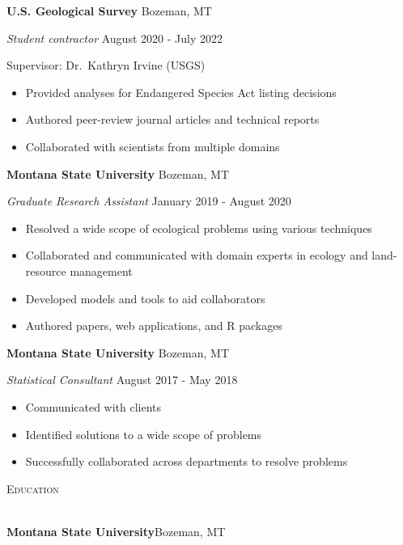 \documentclass[a4paper]{article}
\newcommand{\lineunder} {
	\vspace*{-8pt} \\
	\hspace*{-18pt} \hrulefill \\
}
\newcommand{\header} [1] {
	{\hspace*{-18pt}\vspace*{6pt} \textcolor{Cerulean}{\textsc{#1}}}
	\vspace*{-6pt} \textcolor{Cerulean}{\lineunder}
}
\begin{document}
\textbf{U.S. Geological Survey} \hfill Bozeman, MT

\textit{Student contractor} \hfill August 2020 - July 2022

Supervisor: Dr.~Kathryn Irvine (USGS)

\vspace{-1mm}
\begin{itemize} \itemsep 1pt
   \item Provided analyses for Endangered Species Act listing decisions
   \item Authored peer-review journal articles and technical reports
   \item Collaborated with scientists from multiple domains 
\end{itemize}

\textbf{Montana State University} \hfill Bozeman, MT

\textit{Graduate Research Assistant} \hfill January 2019 - August 2020

\vspace{-1mm}
\begin{itemize} \itemsep 1pt
   \item Resolved a wide scope of ecological problems using various techniques
   \item Collaborated and communicated with domain experts in ecology and land-resource management
   \item Developed models and tools to aid collaborators
   \item Authored papers, web applications, and R packages
\end{itemize}

\textbf{Montana State University} \hfill Bozeman, MT

\textit{Statistical Consultant} \hfill August 2017 - May 2018

\vspace{-1mm}
\begin{itemize} \itemsep 1pt
   \item Communicated with clients
   \item Identified solutions to a wide scope of problems
   \item Successfully collaborated across departments to resolve problems
\end{itemize}

\vspace*{2mm}
\header{Education}
\vspace*{2mm}

\textbf{Montana State University}\hfill Bozeman, MT
\end{document}
